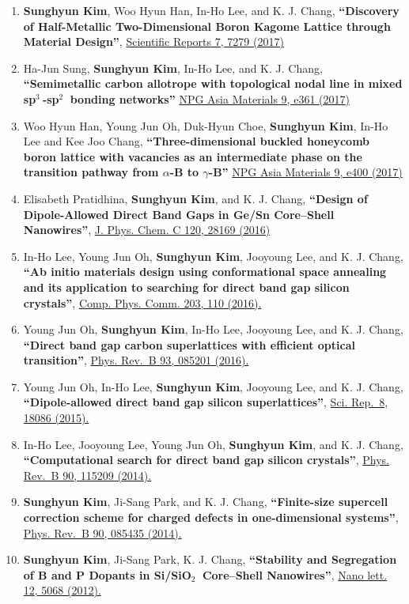 \begin{enumerate}
\item
  \textbf{Sunghyun Kim}, Woo Hyun Han, In-Ho Lee, and K. J. Chang,
  \textbf{``Discovery of Half-Metallic Two-Dimensional Boron Kagome
  Lattice through Material Design''},
  \href{https://www.nature.com/articles/s41598-017-07518-9}{Scientific
  Reports 7, 7279 (2017)}
\item
  Ha-Jun Sung, \textbf{Sunghyun Kim}, In-Ho Lee, and K. J. Chang,
  \textbf{``Semimetallic carbon allotrope with topological nodal line in
  mixed sp\(^3~\)-sp\(^2~\) bonding networks''}
  \href{http://www.nature.com/am/journal/v9/n3/full/am201726a.html}{NPG
  Asia Materials 9, e361 (2017)}
\item
  Woo Hyun Han, Young Jun Oh, Duk-Hyun Choe, \textbf{Sunghyun Kim},
  In-Ho Lee and Kee Joo Chang, \textbf{``Three-dimensional buckled
  honeycomb boron lattice with vacancies as an intermediate phase on the
  transition pathway from \(\alpha\)-B to \(\gamma\)-B''}
  \href{http://www.nature.com/am/journal/v9/n7/full/am201798a.html}{NPG
  Asia Materials 9, e400 (2017)}
\item
  Elisabeth Pratidhina, \textbf{Sunghyun Kim}, and K. J. Chang,
  \textbf{``Design of Dipole-Allowed Direct Band Gaps in Ge/Sn
  Core--Shell Nanowires''},
  \href{http://pubs.acs.org/doi/abs/10.1021/acs.jpcc.6b08779}{J. Phys.
  Chem. C 120, 28169 (2016)}
\item
  In-Ho Lee, Young Jun Oh, \textbf{Sunghyun Kim}, Jooyoung Lee, and K.
  J. Chang, \textbf{``Ab initio materials design using conformational
  space annealing and its application to searching for direct band gap
  silicon crystals''},
  \href{http://dx.doi.org/10.1016/j.cpc.2016.02.011}{Comp. Phys. Comm.
  203, 110 (2016).}
\item
  Young Jun Oh, \textbf{Sunghyun Kim}, In-Ho Lee, Jooyoung Lee, and K.
  J. Chang, \textbf{``Direct band gap carbon superlattices with
  efficient optical transition''},
  \href{http://journals.aps.org/prb/abstract/10.1103/PhysRevB.93.085201}{Phys.
  Rev.~B 93, 085201 (2016).}
\item
  Young Jun Oh, In-Ho Lee, \textbf{Sunghyun Kim}, Jooyoung Lee, and K.
  J. Chang, \textbf{``Dipole-allowed direct band gap silicon
  superlattices''}, \href{http://dx.doi.org/10.1038/srep18086}{Sci.
  Rep.~8, 18086 (2015).}
\item
  In-Ho Lee, Jooyoung Lee, Young Jun Oh, \textbf{Sunghyun Kim}, and K.
  J. Chang, \textbf{``Computational search for direct band gap silicon
  crystals''},
  \href{http://journals.aps.org/prb/abstract/10.1103/PhysRevB.90.115209}{Phys.
  Rev.~B 90, 115209 (2014).}
\item
  \textbf{Sunghyun Kim}, Ji-Sang Park, and K. J. Chang,
  \textbf{``Finite-size supercell correction scheme for charged defects
  in one-dimensional systems''},
  \href{http://journals.aps.org/prb/abstract/10.1103/PhysRevB.90.085435}{Phys.
  Rev.~B 90, 085435 (2014).}
\item
  \textbf{Sunghyun Kim}, Ji-Sang Park, K. J. Chang, \textbf{``Stability
  and Segregation of B and P Dopants in Si/SiO\(_2~\) Core--Shell
  Nanowires''},
  \href{http://pubs.acs.org/doi/abs/10.1021/nl3013924}{Nano lett. 12,
  5068 (2012).}
\end{enumerate}
